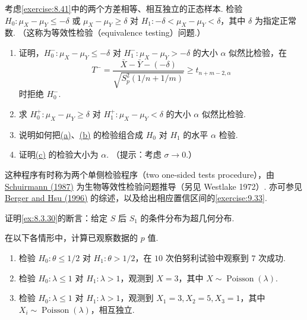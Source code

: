 \begin{exercise}\label{exercise:8.47}
考虑\autoref{exercise:8.41}中的两个方差相等、相互独立的正态样本. 检验 $H_0:\mu_X-\mu_Y\le-\delta\text{ 或 }\mu_X-\mu_Y\ge\delta$ 对 $H_1:-\delta<\mu_X-\mu_Y<\delta$，其中 $\delta$ 为指定正常数. （这称为等效性检验（equivalence testing）问题.）
\begin{enumerate}
\item{}\label{itm:exercise:8.47:a} 证明，$H_0^-:\mu_X-\mu_Y\le-\delta$ 对 $H_1^-:\mu_X-\mu_Y>-\delta$ 的大小 $\alpha$ 似然比检验，在
$$T^-=\frac{\bar X-\bar Y-(-\delta)}{\sqrt{S_p^2(1/n+1/m)}}\ge t_{n+m-2,\alpha}$$
时拒绝 $H_0^-$.
\item{}\label{itm:exercise:8.47:b} 求 $H_0^+:\mu_X-\mu_Y\ge\delta$ 对 $H_1^+:\mu_X-\mu_Y<\delta$ 的大小 $\alpha$ 似然比检验.
\item{}\label{itm:exercise:8.47:c} 说明如何把\hyperref[itm:exercise:8.47:a]{(a)}、\hyperref[itm:exercise:8.47:b]{(b)} 的检验组合成 $H_0$ 对 $H_1$ 的水平 $\alpha$ 检验.
\item 证明\hyperref[itm:exercise:8.47:c]{(c)} 的检验大小为 $\alpha$. （提示：考虑 $\sigma\to0$.）
\end{enumerate}
这种程序有时称为两个单侧检验程序（two one-sided tests procedure），由 \hyperref[bib:source278]{Schuirmann (1987)} 为生物等效性检验问题推导（另见 Westlake 1972\mbox{）.} 亦可参见 \hyperref[bib:source27]{Berger and Hsu (1996)} 的综述，以及给出相应置信区间的\autoref{exercise:9.33}.
\end{exercise}
\begin{exercise}\label{exercise:8.48}
证明\autoref{ex:8.3.30}的断言：给定 $S$ 后 $S_1$ 的条件分布为超几何分布.
\end{exercise}
\begin{exercise}\label{exercise:8.49}
在以下各情形中，计算已观察数据的 $p$ 值.
\begin{enumerate}
\item 检验 $H_0:\theta\le1/2$ 对 $H_1:\theta>1/2$，在 $10$ 次伯努利试验中观察到 $7$ 次成功.
\item 检验 $H_0:\lambda\le1$ 对 $H_1:\lambda>1$，观测到 $X=3$，其中 $X\sim\operatorname{Poisson}(\lambda)$.
\item 检验 $H_0:\lambda\le1$ 对 $H_1:\lambda>1$，观测到 $X_1=3,X_2=5,X_3=1$，其中 $X_i\sim\operatorname{Poisson}(\lambda)$，相互独立.
\end{enumerate}
\end{exercise}
